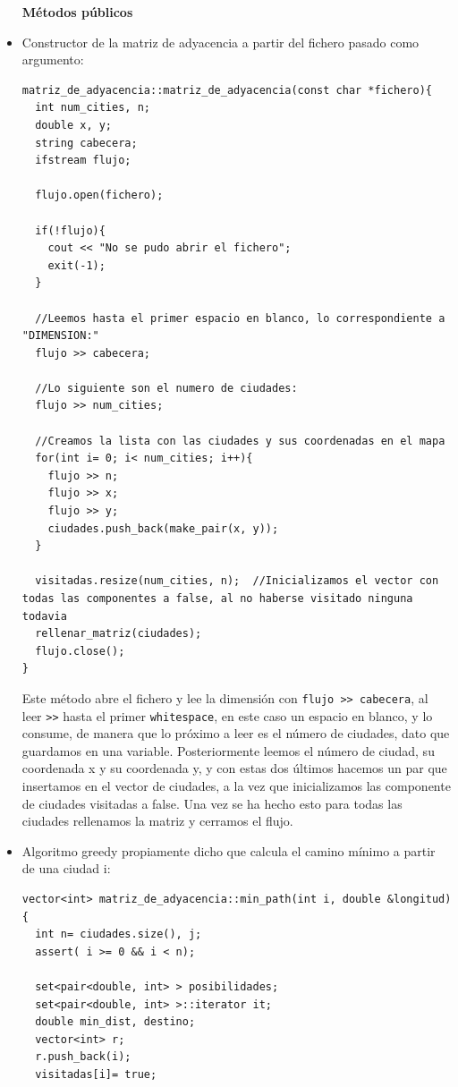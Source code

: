 \documentclass[12pt]{article}
\begin{document}
\begin{itemize}[wide, nosep, labelindent = 0pt, topsep = 1ex]
\item[\textbf{Métodos públicos}] 
\item Constructor de la matriz de adyacencia a partir del fichero pasado como argumento: 
\begin{lstlisting}
matriz_de_adyacencia::matriz_de_adyacencia(const char *fichero){
  int num_cities, n;
  double x, y;
  string cabecera;
  ifstream flujo;

  flujo.open(fichero);

  if(!flujo){
    cout << "No se pudo abrir el fichero";
    exit(-1);
  }

  //Leemos hasta el primer espacio en blanco, lo correspondiente a "DIMENSION:"
  flujo >> cabecera;

  //Lo siguiente son el numero de ciudades:
  flujo >> num_cities;

  //Creamos la lista con las ciudades y sus coordenadas en el mapa
  for(int i= 0; i< num_cities; i++){
    flujo >> n;
    flujo >> x;
    flujo >> y;
    ciudades.push_back(make_pair(x, y));
  }

  visitadas.resize(num_cities, n);	//Inicializamos el vector con todas las componentes a false, al no haberse visitado ninguna todavia
  rellenar_matriz(ciudades);
  flujo.close();
}
\end{lstlisting}

Este método abre el fichero y lee la dimensión con \verb|flujo >> cabecera|, al leer \verb|>>| hasta el primer \verb|whitespace|, en este caso un espacio en blanco, y lo consume, de manera que lo próximo a leer es el número de ciudades, dato que guardamos en una variable. Posteriormente leemos el número de ciudad, su coordenada x y su coordenada y, y con estas dos últimos hacemos un par que insertamos en el vector de ciudades, a la vez que inicializamos las componente de ciudades visitadas a false. Una vez se ha hecho esto para todas las ciudades rellenamos la matriz y cerramos el flujo.

\item Algoritmo greedy propiamente dicho que calcula el camino mínimo a partir de una ciudad i: 
\begin{lstlisting}
vector<int> matriz_de_adyacencia::min_path(int i, double &longitud){
  int n= ciudades.size(), j;
  assert( i >= 0 && i < n);

  set<pair<double, int> > posibilidades;
  set<pair<double, int> >::iterator it;
  double min_dist, destino;
  vector<int> r;
  r.push_back(i);
  visitadas[i]= true;


\end{lstlisting}
\end{itemize}
\end{document}
